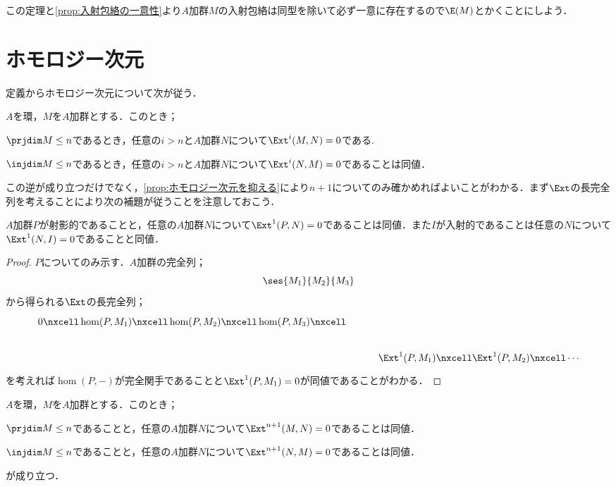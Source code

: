 この定理と\ref{prop:入射包絡の一意性}より$A$加群$M$の入射包絡は同型を除いて必ず一意に存在するので$\E(M)$とかくことにしよう．

\section{ホモロジー次元}
定義からホモロジー次元について次が従う．

\begin{lem}
	$A$を環，$M$を$A$加群とする．このとき；
	\begin{sakura}
		\item $\prjdim M\leq n$であるとき，任意の$i>n$と$A$加群$N$について$\Ext^{i}(M,N)=0$である.
		\item $\injdim M\leq n$であるとき，任意の$i>n$と$A$加群$N$について$\Ext^{i}(N,M)=0$であることは同値．
	\end{sakura}
\end{lem}

この逆が成り立つだけでなく，\ref{prop:ホモロジー次元を抑える}により$n+1$についてのみ確かめればよいことがわかる．まず$\Ext$の長完全列を考えることにより次の補題が従うことを注意しておこう．

\begin{lem}
	$A$加群$P$が射影的であることと，任意の$A$加群$N$について$\Ext^1(P,N)=0$であることは同値．また$I$が入射的であることは任意の$N$について$\Ext^1(N,I)=0$であることと同値．
\end{lem}

\begin{proof}
	$P$についてのみ示す．$A$加群の完全列；
	\[\ses{M_1}{M_2}{M_3}\]
	から得られる$\Ext$の長完全列；
	\[\begin{tikzcd}
	0\nxcell\hom(P,M_1)\nxcell\hom(P,M_2)\nxcell\hom(P,M_3)\nxcell\\&\Ext^1(P,M_1)\nxcell\Ext^1(P,M_2)\nxcell\cdots
	\end{tikzcd}\]
	を考えれば$\hom(P,-)$が完全関手であることと$\Ext^1(P,M_1)=0$が同値であることがわかる．
\end{proof}
\begin{prop}\label{prop:ホモロジー次元を抑える}
	$A$を環，$M$を$A$加群とする．このとき；
	\begin{sakura}
		\item $\prjdim M\leq n$であることと，任意の$A$加群$N$について$\Ext^{n+1}(M,N)=0$であることは同値．
		\item $\injdim M\leq n$であることと，任意の$A$加群$N$について$\Ext^{n+1}(N,M)=0$であることは同値．
	\end{sakura}
	が成り立つ．
\end{prop}

